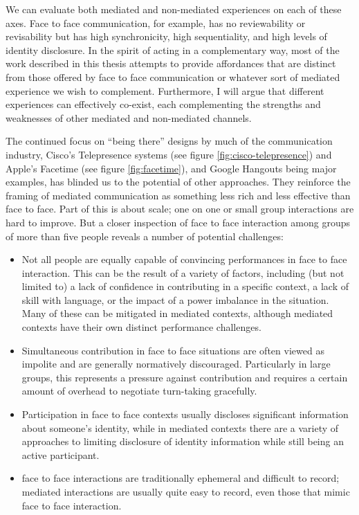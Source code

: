 We can evaluate both mediated and non-mediated experiences on each of these axes. Face to face communication, for example, has no reviewability or revisability but has high synchronicity, high sequentiality, and high levels of identity disclosure. In the spirit of acting in a complementary way, most of the work described in this thesis attempts to provide affordances that are distinct from those offered by face to face communication or whatever sort of mediated experience we wish to complement. Furthermore, I will argue that different experiences can effectively co-exist, each complementing the strengths and weaknesses of other mediated and non-mediated channels.

The continued focus on ``being there'' designs by much of the communication industry, Cisco's Telepresence systems (see figure \ref{fig:cisco-telepresence}) and Apple's Facetime (see figure \ref{fig:facetime}), and Google Hangouts being major examples, has blinded us to the potential of other approaches. They reinforce the framing of mediated communication as something less rich and less effective than face to face. Part of this is about scale; one on one or small group interactions are hard to improve. But a closer inspection of face to face interaction among groups of more than five people reveals a number of potential challenges:


\begin{itemize}
\item Not all people are equally capable of convincing performances in face to face interaction. This can be the result of a variety of factors, including (but not limited to) a lack of confidence in contributing in a specific context, a lack of skill with language, or the impact of a power imbalance in the situation. Many of these can be mitigated in mediated contexts\citep{Siegel:1986ve}, although mediated contexts have their own distinct performance challenges.
\item Simultaneous contribution in face to face situations are often viewed as impolite and are generally normatively discouraged. Particularly in large groups, this represents a pressure against contribution and requires a certain amount of overhead to negotiate turn-taking gracefully.
\item Participation in face to face contexts usually discloses significant information about someone's identity, while in mediated contexts there are a variety of approaches to limiting disclosure of identity information while still being an active participant.
\item face to face interactions are traditionally ephemeral and difficult to record; mediated interactions are usually quite easy to record, even those that mimic face to face interaction. 
\end{itemize}


